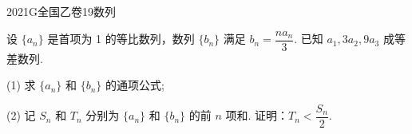 
\begin{problem}{2021}{G}{全国乙卷}{19}{数列}

设 $\{a_n\}$ 是首项为 1 的等比数列，数列 $\{b_n\}$ 满足 $b_n=\dfrac{na_n}{3}$. 已知 $a_1, 3a_2, 9a_3$ 成等差数列.

(1) 求 $\{a_n\}$ 和 $\{b_n\}$ 的通项公式;

(2) 记 $S_n$ 和 $T_n$ 分别为 $\{a_n\}$ 和 $\{b_n\}$ 的前 $n$ 项和. 证明：$T_n<\dfrac{S_n}{2}$.

\end{problem}